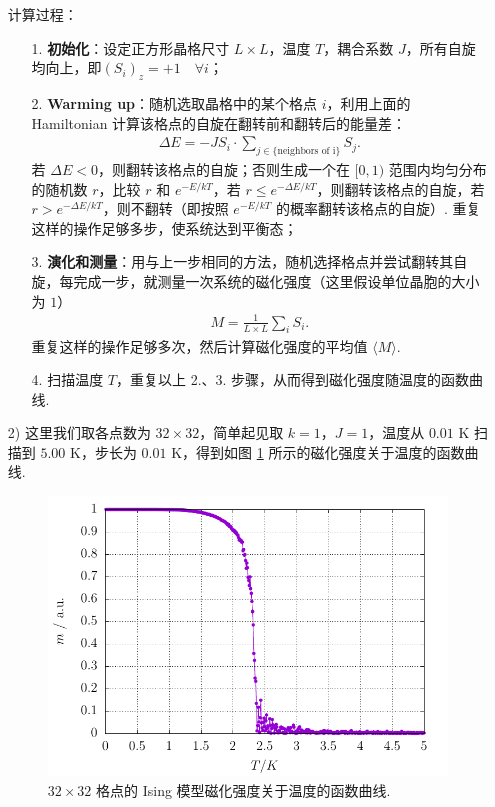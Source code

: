 \documentclass{assignment}
\begin{document}
\begin{sol}
\begin{itemize}
        计算过程：
        \begin{itemize}
            \item[1.] \textbf{初始化}：设定正方形晶格尺寸 $L\times L$，温度 $T$，耦合系数 $J$，所有自旋均向上，即$(S_i)_z=+1\quad\forall i$；
            \item[2.] \textbf{Warming up}：随机选取晶格中的某个格点 $i$，利用上面的 Hamiltonian 计算该格点的自旋在翻转前和翻转后的能量差：
            \begin{align}
                \Delta E=-JS_i\cdot\sum_{j\in\{\text{neighbors of i}\}}S_j.
            \end{align}
            若 $\Delta E<0$，则翻转该格点的自旋；否则生成一个在 $[0,1)$ 范围内均匀分布的随机数 $r$，比较 $r$ 和 $e^{-E/kT}$，若 $r\leq e^{-\Delta E/kT}$，则翻转该格点的自旋，若 $r>e^{-\Delta E/kT}$，则不翻转（即按照 $e^{-E/kT}$ 的概率翻转该格点的自旋）. 重复这样的操作足够多步，使系统达到平衡态；
            \item[3.] \textbf{演化和测量}：用与上一步相同的方法，随机选择格点并尝试翻转其自旋，每完成一步，就测量一次系统的磁化强度（这里假设单位晶胞的大小为 $1$）
            \begin{align}
                M=\frac{1}{L\times L}\sum_iS_i.
            \end{align}
            重复这样的操作足够多次，然后计算磁化强度的平均值 $\langle M\rangle$.
            \item[4.] 扫描温度 $T$，重复以上 2.、3. 步骤，从而得到磁化强度随温度的函数曲线.
        \end{itemize}
        \item[2)] 这里我们取各点数为 $32\times 32$，简单起见取 $k=1$，$J=1$，温度从 $0.01$ K 扫描到 $5.00$ K，步长为 $0.01$ K，得到如图 \ref{4-M-T} 所示的磁化强度关于温度的函数曲线.
        \begin{figure}[H]
            \centering
            \includegraphics[width=.5\columnwidth]{P4.pdf}
            \caption{$32\times 32$ 格点的 Ising 模型磁化强度关于温度的函数曲线.}
            \label{4-M-T}
        \end{figure}

\end{itemize}
\end{sol}
\end{document}

